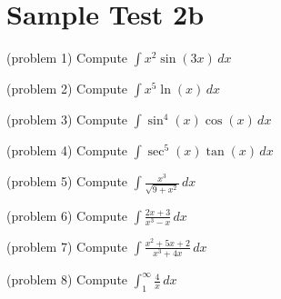 \documentclass[handout]{ximera}
\begin{document}
\section{Sample Test 2b}





\begin{problem}(problem 1)
Compute $\displaystyle \int x^2\sin(3x) \, dx$

\end{problem}


\begin{problem}(problem 2)
Compute $\displaystyle \int x^5 \ln(x) \, dx$

\end{problem}

\begin{problem}(problem 3)
Compute $\displaystyle \int \sin^4(x) \cos(x) \, dx$

\end{problem}

\begin{problem}(problem 4)
Compute $\displaystyle \int \sec^5(x) \tan(x)  \, dx$

\end{problem}

\begin{problem}(problem 5)
Compute $\displaystyle \int \frac{x^3}{ \sqrt{9+x^2}} \, dx$

\end{problem}

\begin{problem}(problem 6)
Compute $\displaystyle \int \frac{2x+3}{x^3-x} \, dx$

\end{problem}

\begin{problem}(problem 7)
Compute $\displaystyle \int \frac{x^2 + 5x + 2}{x^3 + 4x} \, dx$

\end{problem}

\begin{problem}(problem 8)
Compute $\displaystyle \int_1^\infty \frac{4}{x} \, dx$

\end{problem}
\end{document}
